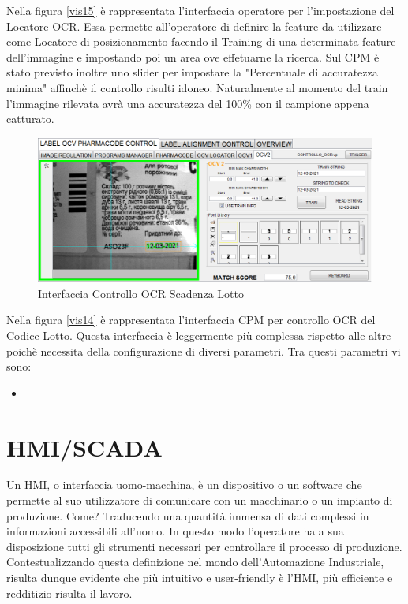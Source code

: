 \documentclass[12pt, a4paper, oneside]{book}
\begin{document}
Nella figura \ref{vis15} è rappresentata l'interfaccia operatore per l'impostazione del Locatore OCR. Essa permette all'operatore di definire la feature da utilizzare come Locatore di posizionamento facendo il Training di una determinata feature dell'immagine e impostando poi un area ove effetuarne la ricerca. Sul CPM è stato previsto inoltre uno slider per impostare la "Percentuale di accuratezza minima" affinchè il controllo risulti idoneo. Naturalmente al momento del train l'immagine rilevata avrà una accuratezza del 100\% con il campione appena catturato.

\begin{figure}[H]
	\centering
	\includegraphics[width=13cm]{Immagini/VIS16}
	\caption{Interfaccia Controllo OCR Scadenza Lotto}
	\label{vis16}
\end{figure}

Nella figura \ref{vis14} è rappresentata l'interfaccia CPM per controllo OCR del Codice Lotto. Questa interfaccia è leggermente più complessa rispetto alle altre poichè necessita della configurazione di diversi parametri. Tra questi parametri vi sono:
\begin{itemize}
	\item 
\end{itemize}

\chapter{HMI/SCADA}
Un HMI, o interfaccia uomo-macchina, è un dispositivo o un software che permette al suo utilizzatore di comunicare con un macchinario o un impianto di produzione. Come? Traducendo una quantità immensa di dati complessi in informazioni accessibili all’uomo. In questo modo l’operatore ha a sua disposizione tutti gli strumenti necessari per controllare il processo di produzione.
Contestualizzando questa definizione nel mondo dell’Automazione Industriale, risulta dunque evidente che più intuitivo e user-friendly è l’HMI, più efficiente e redditizio risulta il lavoro.
\end{document}
